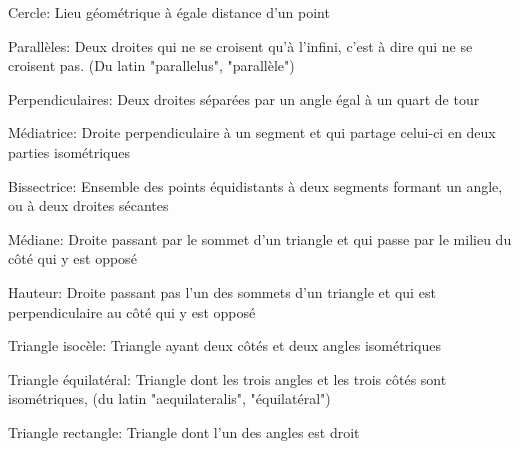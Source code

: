\documentclass[a4paper,12pt]{article}
\begin{document}
\begin{definition}{Cercle: }
Lieu géométrique à égale distance d'un point
\end{definition}
\begin{definition}{Parallèles:}
Deux droites qui ne se croisent qu'à l'infini, c'est à dire qui ne se croisent pas. (Du latin "parallelus", "parallèle")
\end{definition}
\begin{definition}{Perpendiculaires:}
Deux droites séparées par un angle égal à un quart de tour
\end{definition}
\begin{definition}{Médiatrice:}\label{def:mediatrice}
Droite perpendiculaire à un segment et qui partage celui-ci en deux parties isométriques
\end{definition}
\begin{definition}{Bissectrice:}
Ensemble des points équidistants à deux segments formant un angle, ou à deux droites sécantes
\end{definition}
\begin{definition}{Médiane:}
Droite passant par le sommet d'un triangle et qui passe par le milieu du côté qui y est opposé
\end{definition}
\begin{definition}{Hauteur:}
Droite passant pas l'un des sommets d'un triangle et qui est perpendiculaire au côté qui y est opposé
\end{definition}
\begin{definition}{Triangle isocèle:}
Triangle ayant deux côtés et deux angles isométriques
\end{definition}
\begin{definition}{Triangle équilatéral:}
Triangle dont les trois angles et les trois côtés sont isométriques, (du latin "aequilateralis", "équilatéral")
\end{definition}
\begin{definition}{Triangle rectangle:}
Triangle dont l'un des angles est droit
\end{definition}
\end{document}

